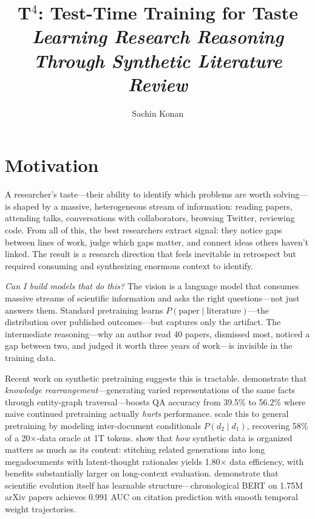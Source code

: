 \documentclass[10pt]{article}
\title{\vspace{-2cm}\Large T$^4$: Test-Time Training for Taste\\\normalsize\textit{Learning Research Reasoning Through Synthetic Literature Review}\vspace{-0.5cm}}
\author{Sachin Konan}
\date{}
\begin{document}
\maketitle
\thispagestyle{empty}

\section{Motivation}

A researcher's taste---their ability to identify which problems are worth solving---is shaped by a massive, heterogeneous stream of information: reading papers, attending talks, conversations with collaborators, browsing Twitter, reviewing code. From all of this, the best researchers extract signal: they notice gaps between lines of work, judge which gaps matter, and connect ideas others haven't linked. The result is a research direction that feels inevitable in retrospect but required consuming and synthesizing enormous context to identify.

\textit{Can I build models that do this?} The vision is a language model that consumes massive streams of scientific information and asks the right questions---not just answers them. Standard pretraining learns $P(\text{paper} \mid \text{literature})$---the distribution over published outcomes---but captures only the artifact. The intermediate reasoning---why an author read 40 papers, dismissed most, noticed a gap between two, and judged it worth three years of work---is invisible in the training data.

Recent work on synthetic pretraining suggests this is tractable. \textcite{yang2024entigraph} demonstrate that \textit{knowledge rearrangement}---generating varied representations of the same facts through entity-graph traversal---boosts QA accuracy from 39.5\% to 56.2\% where naive continued pretraining actually \textit{hurts} performance. \textcite{yang2025sbp} scale this to general pretraining by modeling inter-document conditionals $P(d_2 \mid d_1)$, recovering 58\% of a 20$\times$-data oracle at 1T tokens. \textcite{kim2025megadocs} show that \textit{how} synthetic data is organized matters as much as its content: stitching related generations into long megadocuments with latent-thought rationales yields 1.80$\times$ data efficiency, with benefits substantially larger on long-context evaluation. \textcite{dong2024annualbert} demonstrate that scientific evolution itself has learnable structure---chronological BERT on 1.75M arXiv papers achieves 0.991 AUC on citation prediction with smooth temporal weight trajectories.
\end{document}
